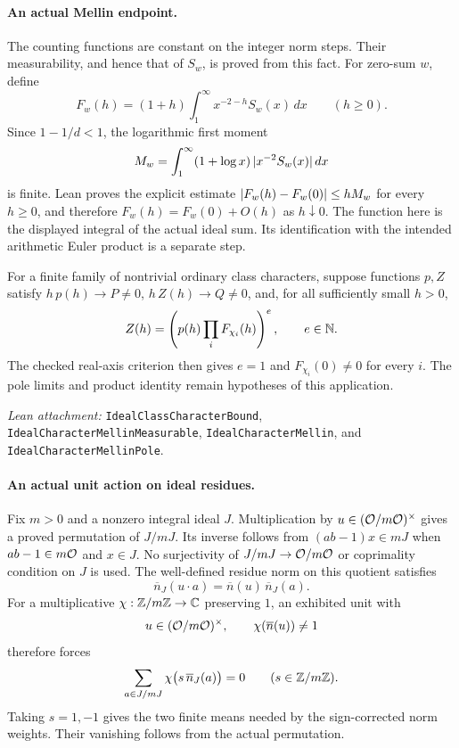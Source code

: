 \paragraph{An actual Mellin endpoint.}
The counting functions are constant on the integer norm steps. Their
measurability, and hence that of $S_w$, is proved from this fact.
For zero-sum $w$, define
\[
 F_w(h)=(1+h)\int_1^{\infty}x^{-2-h}S_w(x)\,dx
 \qquad(h\geq0).
\]
Since $1-1/d<1$, the logarithmic first moment
\[
 M_w=\int_1^{\infty}(1+\log x)\,\lvert x^{-2}S_w(x)\rvert\,dx
\]
is finite. Lean proves the explicit estimate
$\lvert F_w(h)-F_w(0)\rvert\leq hM_w$ for every $h\geq0$, and therefore
$F_w(h)=F_w(0)+O(h)$ as $h\downarrow0$.
The function here is the displayed integral of the actual ideal sum.
Its identification with the intended arithmetic Euler product is a separate step.

For a finite family of nontrivial ordinary class characters, suppose functions
$p,Z$ satisfy $h\,p(h)\to P\ne0$, $h\,Z(h)\to Q\ne0$, and, for all sufficiently
small $h>0$,
\[
 Z(h)=\left(p(h)\prod_i F_{\chi_i}(h)\right)^e,
 \qquad e\in\mathbb N.
\]
The checked real-axis criterion then gives $e=1$ and
$F_{\chi_i}(0)\ne0$ for every $i$. The pole limits and product identity
remain hypotheses of this application.

\smallskip
\noindent\emph{Lean attachment:}
\texttt{IdealClassCharacterBound}, \texttt{IdealCharacterMellinMeasurable},
\texttt{IdealCharacterMellin}, and \texttt{IdealCharacterMellinPole}.

\newpage
\paragraph{An actual unit action on ideal residues.}
Fix $m>0$ and a nonzero integral ideal $J$.
Multiplication by $u\in(\mathcal O/m\mathcal O)^{\times}$ gives a proved permutation of
$J/mJ$. Its inverse follows from $(ab-1)x\in mJ$ when
$ab-1\in m\mathcal O$ and $x\in J$. No surjectivity of
$J/mJ\to\mathcal O/m\mathcal O$ or coprimality condition on $J$ is used.
The well-defined residue norm on this quotient satisfies
\[
 \overline n_J(u\cdot a)=\overline n(u)\,\overline n_J(a).
\]
For a multiplicative $\chi:\mathbb Z/m\mathbb Z\to\mathbb C$ preserving $1$, an exhibited
unit with
\begin{equation}\label{eq:unit-witness}
 u\in(\mathcal O/m\mathcal O)^{\times},\qquad \chi(\overline n(u))\ne1
\end{equation}
therefore forces
\[
 \sum_{a\in J/mJ}\chi\bigl(s\,\overline n_J(a)\bigr)=0
 \qquad(s\in\mathbb Z/m\mathbb Z).
\]
Taking $s=1,-1$ gives the two finite means needed by the sign-corrected
norm weights. Their vanishing follows from the actual permutation.

